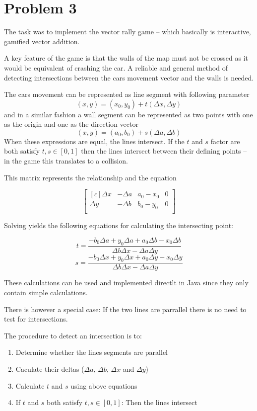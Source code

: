 \section*{Problem 3}

The task was to implement the vector rally game -- which basically is
interactive, gamified vector addition.

A key feature of the game is that the walls of the map must not be crossed as
it would be equivalent of crashing the car. A reliable and general method of
detecting intersections between the cars movement vector and the walls is
needed.

The cars movement can be represented as line segment with following parameter
$$ (x, y) = (x_0, y_0) + t (\Delta x, \Delta y) $$
and in a similar fashion a wall segment can be represented as two points with
one as the origin and one as the direction vector
$$ (x, y) = (a_0, b_0) + s (\Delta a, \Delta b) $$
When these expressions are equal, the lines intersect. If the $t$ and $s$
factor are both satisfy $t, s \in [0,1]$ then the lines intersect between
their defining points -- in the game this translates to a collision.

This matrix represents the relationship and the equation

$$
\begin{bmatrix*}[c]
 \Delta x & -\Delta a & a_0 - x_0 & 0 \\
 \Delta y & -\Delta b & b_0 - y_0 & 0\\
\end{bmatrix*}
$$

Solving yields the following equations for calculating the 
intersecting point:

$$ t = \frac{-b_0 \Delta a + y_0 \Delta a + a_0 \Delta b - x_0 \Delta b}{\Delta b \Delta x - \Delta a \Delta y} $$
$$ s = \frac{-b_0 \Delta x + y_0 \Delta x + a_0 \Delta y - x_0 \Delta y}{\Delta b \Delta x - \Delta a \Delta y} $$

These calculations can be used and implemented directlt in Java since they
only contain simple calculations.

There is however a special case: If the two lines are parrallel there is no
need to test for intersections.

The procedure to detect an intersection is to:
\begin{enumerate}
\item Determine whether the lines segments are parallel
\item Caculate their deltas ($\Delta a$, $\Delta b$, $\Delta x$ and $\Delta y$)
\item Calculate $t$ and $s$ using above equations
\item If $t$ and $s$ both satisfy $t, s \in [0,1]$: Then the lines intersect
\end{enumerate}


